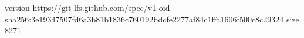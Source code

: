 version https://git-lfs.github.com/spec/v1
oid sha256:3e19347507fd6a3b81b1836c760192bdcfe2277af84c1ffa1606f500c8c29324
size 8271
